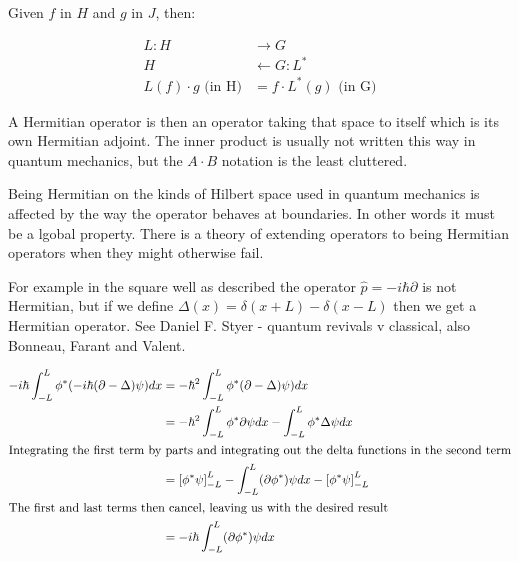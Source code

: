 \documentclass[a4paper, 12pt]{article}
\theoremstyle{definition}
\begin{document}
Given $f$ in $H$ and $g$ in $J$, then:

\begin{align*}
  L:H&\rightarrow G \\
 H&\leftarrow G:L^{*}\\
L(f)\cdot g \text{ (in H)} &= f\cdot L^{*}(g) \text{ (in G)} 
\end{align*}

A Hermitian operator is then an operator taking that space to itself which is its own Hermitian adjoint. The inner product is usually not written this way in quantum mechanics, but the $A\cdot B$ notation is the least cluttered.

Being Hermitian on the kinds of Hilbert space used in quantum mechanics is affected by the way the operator behaves at boundaries. In other words it must be a lgobal property. There is a theory of extending operators to being Hermitian operators when they might otherwise fail.

For example in the square well as described the operator $\hat{p} = -i\hbar \partial$ is not Hermitian, but if we define $\Delta(x)=\delta(x + L) - \delta(x - L)$ then we get a Hermitian operator. See Daniel F. Styer - quantum revivals v classical, also Bonneau, Farant and Valent.

\begin{align*}
  -i\hbar\int_{-L}^{L}\phi^{*}(-i\hbar(\partial - \Delta)\psi)dx &= -\hbar^2 \int_{-L}^{L}\phi^{*}(\partial - \Delta)\psi)dx \\
& = -\hbar^2 \int_{-L}^{L}\phi^{*}\partial\psi dx - \int_{-L}^{L}\phi^{*}\Delta\psi dx \\
\intertext{Integrating the first term by parts and integrating out the delta functions in the second term}
& = \left[\phi^{*}\psi\right]_{-L}^{L} - \int_{-L}^{L}(\partial\phi^{*})\psi dx - \left[\phi^{*}\psi\right]_{-L}^{L} \\
\intertext{The first and last terms then cancel, leaving us with the desired result}

&=-i\hbar\int_{-L}^{L}(\partial\phi^{*})\psi dx
\end{align*}
\end{document}
